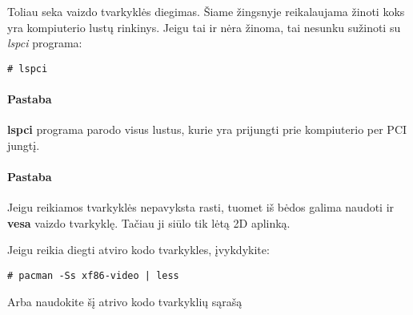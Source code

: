       Toliau seka vaizdo tvarkyklės diegimas. Šiame žingsnyje
      reikalaujama žinoti koks yra kompiuterio lustų rinkinys. Jeigu
      tai ir nėra žinoma, tai nesunku sužinoti su \textsl{lspci}
      programa:

      \begin{verbatim}
# lspci
      \end{verbatim}

      \paragraph{Pastaba} \textbf{lspci} programa parodo visus lustus,
      kurie yra prijungti prie kompiuterio per PCI jungtį.

      \paragraph{Pastaba} Jeigu reikiamos tvarkyklės nepavyksta rasti,
      tuomet iš bėdos galima naudoti ir \textbf{vesa} vaizdo
      tvarkyklę. Tačiau ji siūlo tik lėtą 2D aplinką. 

      Jeigu reikia diegti atviro kodo tvarkykles, įvykdykite:

      \begin{verbatim}
# pacman -Ss xf86-video | less
      \end{verbatim}

      Arba naudokite šį atrivo kodo tvarkyklių sąrašą

